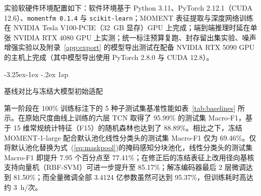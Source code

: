 \documentclass[12pt]{iopjournal}
\makeatletter
\renewcommand\subsection{\@startsection{subsection}{2}{\z@}%
                   {-3.25ex\@plus -1ex \@minus -.2ex}%
                   {1sp}%
                   {\reset@font\normalsize\bfseries\raggedright}}
\makeatother
\begin{document}
实验软硬件环境配置如下：软件环境基于 Python 3.11、PyTorch 2.12.1（CUDA 12.6）、\texttt{momentfm 0.1.4} 与 \texttt{scikit-learn}；MOMENT 表征提取与深度网络训练在 NVIDIA Tesla V100-PCIE（32~GB 显存）GPU 上完成；端到端推理时延在单张 NVIDIA RTX 4080 GPU 上实测；统一标注预算复跑、封存留出集实验、噪声增强实验以及附录~\ref{app:export} 的模型导出测试在配备 NVIDIA RTX 5090 GPU 的主机上完成（其中模型导出使用 PyTorch 2.8.0 与 CUDA 12.8）。

\subsection{基线对比与冻结大模型初始适配}\label{sec:baselines}

第一阶段在 100\% 训练标注下的 5 种子测试集基准性能如表~\ref{tab:baselines} 所示。在原始尺度曲线上训练的六层 TCN 取得了 95.99\% 的测试集 Macro-F1，基于 15 维常规统计特征（F15）的随机森林也达到了 88.89\%。相比之下，冻结 MOMENT-1-large 配合默认池化线性分类头的测试集 Macro-F1 仅为 69.46\%。仅将默认池化替换为式~(\ref{eq:maskpool})的掩码感知分块池化，线性分类头的测试集 Macro-F1 即提升 7.95 个百分点至 77.41\%；在修正后的冻结表征上改用径向基核支持向量机（RBF-SVM）可进一步提升至 85.17\%；解冻编码器最后 2 层微调达到 81.50\%；而全量微调全部 3.4124 亿参数虽然可达到 95.37\%，但训练耗时高达约 3~h/次。
\end{document}
